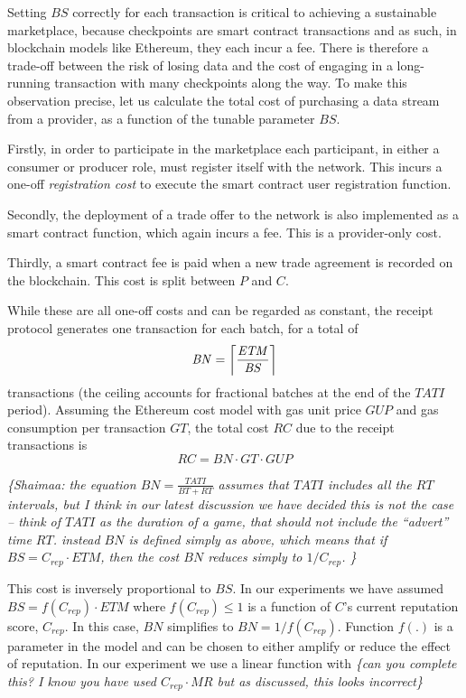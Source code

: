 \documentclass[letterpaper, 10 pt, conference]{ieeeconf}  %
\DeclarePairedDelimiter{\ceil}{\lceil}{\rceil}
\newcommand{\mynote}[1]{{\leavevmode\smaller\itshape\color{red}\{#1\}}}
\newcommand{\bs}{\ensuremath{\mathit{BS}}}
\newcommand{\mr}{\ensuremath{\mathit{MR}}}
\newcommand{\tati}{\ensuremath{\mathit{TATI}}}
\newcommand{\etm}{\ensuremath{\mathit{ETM}}}
\newcommand{\bn}{\ensuremath{\mathit{BN}}}
\newcommand{\rt}{\ensuremath{\mathit{RT}}}
\newcommand{\bt}{\ensuremath{\mathit{BT}}}
\newcommand{\crep}{\ensuremath{C_{\mathit{rep}} }}
\newcommand{\gt}{\ensuremath{\mathit{GT}}}
\newcommand{\rc}{\ensuremath{\mathit{RC}}}   %
\newcommand{\gup}{\ensuremath{\mathit{GUP}}}
\begin{document}
Setting \bs{} correctly for each transaction is critical to achieving a sustainable marketplace, because checkpoints are smart contract transactions and as such, in blockchain models like Ethereum, they each incur a fee. There is therefore a trade-off between the risk of losing data and the cost of engaging in a long-running transaction with many checkpoints along the way.
To make this observation precise, let us calculate the total cost of purchasing a data stream from a provider, as a function of the tunable parameter \bs.

Firstly, in order to participate in the marketplace each participant, in either a consumer or producer role, must register itself with the network. 
This incurs a one-off \textit{registration cost} to execute the smart contract user registration function.

Secondly, the deployment of a trade offer to the network is also implemented as a smart contract function, which again incurs a fee. This is a provider-only cost.

Thirdly, a smart contract fee is paid when a new trade agreement is recorded on the blockchain. This cost is split between $P$ and $C$.
%

While these are all one-off costs and can be regarded as constant, the receipt protocol generates one transaction for each batch, for a total of 
\[\bn = \ceil[\bigg] {\frac{\etm}{\bs}} \]
transactions (the ceiling accounts for fractional batches at the end of the \tati{} period). 
Assuming the Ethereum cost model with gas unit price \gup{} and gas consumption per transaction \gt, the total cost \rc{} due to the receipt transactions is 
\[\rc = \bn \cdot  \gt \cdot \gup    \]

\mynote{Shaimaa:  the equation $\bn=\frac{\tati}{\bt+\rt}$ assumes that \tati{} includes all the \rt{} intervals, but I think in our latest discussion we have decided this is not the case -- think of \tati{} as the duration of a game, that should not include the ``advert'' time \rt{}. instead \bn{} is defined simply as above, which means that if $\bs=C_{rep} \cdot \etm$, then the cost \bn{} reduces simply to $1/C_{rep}$.
}

This cost is inversely proportional to \bs{}. In our experiments we have assumed $\bs= f(\crep) \cdot \etm$ where   $f(\crep{}) \leq 1$ is a function of $C$'s current reputation score, \crep.
In this case, \bn{} simplifies to $\bn =  1/f(\crep{})$.
Function $f(.)$ is a parameter in the model and can be chosen to either amplify or reduce the effect of reputation. In our experiment we use a linear function with \mynote{can you complete this?  I know you have used $\crep \cdot \mr$ but as discussed, this looks incorrect}
\end{document}
